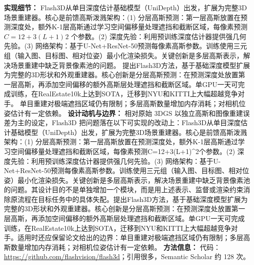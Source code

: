 \textbf{实现细节：} Flash3D从单目深度估计基础模型（UniDepth）出发，扩展为完整3D场景重建器。核心是前馈高斯泼溅架构：(1) 分层高斯预测：第一层高斯放置在预测深度处，额外K-1层高斯通过学习空间偏移量处理遮挡和截断区域，每像素预测 $C=12+3(L+1)^{}2$ 个参数。(2) 深度先验：利用预训练深度估计器提供强几何先验。(3) 网络架构：基于U-Net+ResNet-50预测每像素高斯参数。训练使用三元组（输入图、目标图、相对位姿）最小化渲染损失。关键创新是多层高斯表示，解决场景重建中缺乏背景像素池的问题。 提出Flash3D方法，基于基础深度模型扩展为完整的3D形状和外观重建器。核心创新是分层高斯预测：在预测深度处放置第一层高斯，再添加空间偏移的额外高斯层处理遮挡和截断区域。单GPU一天可完成训练，在RealEstate10k上达到SOTA，迁移到NYU和KITTI上大幅超越竞争对手。 单目重建对极端遮挡区域仍有限制；多层高斯数量增加内存消耗；对相机位姿估计有一定依赖。
\textbf{设计动机与边界：} 相对原始 3DGS 以独立高斯和图像重建误差为主的设定，Flash3D 把问题落在以下可实现的改动上：Flash3D从单目深度估计基础模型（UniDepth）出发，扩展为完整3D场景重建器。核心是前馈高斯泼溅架构：(1) 分层高斯预测：第一层高斯放置在预测深度处，额外K-1层高斯通过学习空间偏移量处理遮挡和截断区域，每像素预测C=12+3(L+1)\^{}2个参数。(2) 深度先验：利用预训练深度估计器提供强几何先验。(3) 网络架构：基于U-Net+ResNet-50预测每像素高斯参数。训练使用三元组（输入图、目标图、相对位姿）最小化渲染损失。关键创新是多层高斯表示，解决场景重建中缺乏背景像素池的问题。其设计目的不是单独增加一个模块，而是用上述表示、监督或渲染约束消除原流程在目标任务中的具体失配。提出Flash3D方法，基于基础深度模型扩展为完整的3D形状和外观重建器。核心创新是分层高斯预测：在预测深度处放置第一层高斯，再添加空间偏移的额外高斯层处理遮挡和截断区域。单GPU一天可完成训练，在RealEstate10k上达到SOTA，迁移到NYU和KITTI上大幅超越竞争对手。适用时还应保留论文给出的边界：单目重建对极端遮挡区域仍有限制；多层高斯数量增加内存消耗；对相机位姿估计有一定依赖。
\textbf{方法信息：} 代码：\url{https://github.com/flashvision/flash3d}；引用很多，Semantic Scholar 约 128 次。

